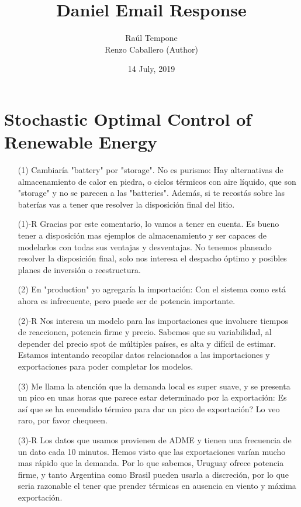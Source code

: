 \documentclass[12pt]{article}
\theoremstyle{definition}
\theoremstyle{remark}
\begin{document}
\title{Daniel Email Response}
\author{Ra\'ul Tempone\\
Renzo Caballero (Author)}
\date{14 July, 2019}
\maketitle

\section*{Stochastic Optimal Control of Renewable Energy}

\begin{enumerate}

\item[(1)] Cambiar\'ia "battery" por "storage". No es purismo: Hay alternativas de almacenamiento de calor en piedra, o ciclos t\'ermicos con aire l\'iquido, que son "storage" y no se parecen a las "batteries". Además, si te recostás sobre las bater\'ias vas a tener que resolver la disposici\'on final del litio.

\item[(1)-R] Gracias por este comentario, lo vamos a tener en cuenta. Es bueno tener a disposici\'on mas ejemplos de almacenamiento y ser capaces de modelarlos con todas sus ventajas y desventajas. No tenemos planeado resolver la disposici\'on final, solo nos interesa el despacho \'optimo y posibles planes de inversi\'on o reestructura.

\item[(2)] En "production" yo agregar\'ia la importaci\'on: Con el sistema como est\'a ahora es infrecuente, pero puede ser de potencia importante.

\item[(2)-R] Nos interesa un modelo para las importaciones que involucre tiempos de reaccionen, potencia firme y precio. Sabemos que su variabilidad, al depender del precio spot de m\'ultiples pa\'ises, es alta y dif\'icil de estimar. Estamos intentando recopilar datos relacionados a las importaciones y exportaciones para poder completar los modelos.

\item[(3)] Me llama la atenci\'on que la demanda local es super suave, y se presenta un pico en unas horas que parece estar determinado por la exportaci\'on: Es as\'i que se ha encendido t\'ermico para dar un pico de exportaci\'on? Lo veo raro, por favor chequeen.

\item[(3)-R] Los datos que usamos provienen de ADME y tienen una frecuencia de un dato cada 10 minutos. Hemos visto que las exportaciones var\'ian mucho mas r\'apido que la demanda. Por lo que sabemos, Uruguay ofrece potencia firme, y tanto Argentina como Brasil pueden usarla a discreci\'on, por lo que seria razonable el tener que prender t\'ermicas en ausencia en viento y m\'axima exportaci\'on.


\end{enumerate}
\end{document}
